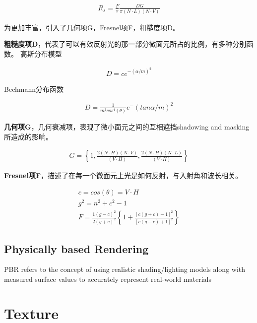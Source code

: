 \begin{align*}
    R_s = \frac{F}{\pi} \frac{DG}{\pi (N \cdot L)(N \cdot V)}
\end{align*}

为更加丰富，引入了几何项G，Fresnel项F，粗糙度项D。
\newline

\textbf{粗糙度项D}，代表了可以有效反射光的那一部分微面元所占的比例，有多种分别函数。
高斯分布模型
\newline

\begin{align*}
    D = ce^{-(\alpha / m)^2}
\end{align*}

Bechmann分布函数
\newline

\begin{align*}
    D = \frac{1}{m^2cos^4(\theta)}e^-(tan\alpha / m)^2
\end{align*}

\textbf{几何项G}，几何衰减项，表现了微小面元之间的互相遮挡shadowing and masking所造成的影响。
\newline

\begin{align*}
    G = \left\{
        1, \frac{2(N \cdot H)(N \cdot V)}{(V \cdot H)}, \frac{2(N \cdot H)(N \cdot L)}{(V \cdot H)} 
    \right\}
\end{align*}

\textbf{Fresnel项F}，描述了在每一个微面元上光是如何反射，与入射角和波长相关。
\newline

\begin{align*}
    c = cos(\theta) = V \cdot H \\
    g^2 = n^2 + c^2 - 1 \\
F = \frac{1(g-c)^2}{2(g+c)^2} \left\{ 1+\frac{[c(g+c)-1]^2}{[c(g-c)+1]^2} \right\}
\end{align*}

\section{Physically based Rendering}

PBR refers to the concept of using realistic shading/lighting models along with measured surface values to accurately represent real-world materials

\chapter{Texture}

